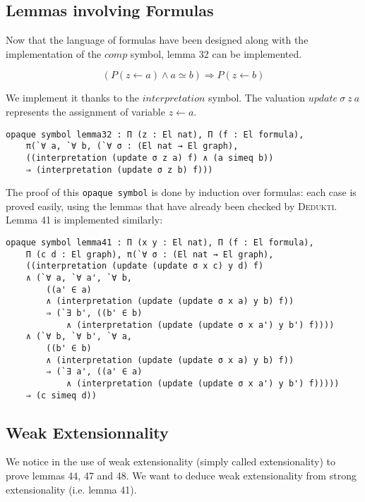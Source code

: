 \documentclass[submission,copyright,creativecommons]{eptcs}
\def\imp{\mathbin{\Rightarrow}}
\def\conj{\mathbin{\wedge}}
\newcommand{\dedukti}{\textsc{Dedukti}}
\begin{document}
\subsection{Lemmas involving Formulas}

Now that the language of formulas have been designed along with the implementation of the $comp$ symbol, lemma 32 can be implemented.

$$(P(z \leftarrow a) \conj a \simeq b) \imp P(z \leftarrow b)$$

We implement it thanks to the $interpretation$ symbol. The valuation $update~\sigma~z~a$ represents the assignment of variable $z \leftarrow a$.

\begin{lstlisting}
opaque symbol lemma32 : Π (z : El nat), Π (f : El formula), 
	π(`∀ a, `∀ b, (`∀ σ : (El nat → El graph),
	((interpretation (update σ z a) f) ∧ (a simeq b)) 
	⇒ (interpretation (update σ z b) f)))
\end{lstlisting}

The proof of this \texttt{opaque symbol} is done by induction over formulas: each case is proved easily, using the lemmas that have already been checked by \dedukti. \\

Lemma 41 is implemented similarly:

\begin{lstlisting}
opaque symbol lemma41 : Π (x y : El nat), Π (f : El formula), 
	Π (c d : El graph), π(`∀ σ : (El nat → El graph), 
	((interpretation (update (update σ x c) y d) f)
	∧ (`∀ a, `∀ a', `∀ b, 
		((a' ∈ a) 
		∧ (interpretation (update (update σ x a) y b) f)) 
		⇒ (`∃ b', ((b' ∈ b) 
			∧ (interpretation (update (update σ x a') y b') f))))
	∧ (`∀ b, `∀ b', `∀ a, 
		((b' ∈ b) 
		∧ (interpretation (update (update σ x a) y b) f)) 
		⇒ (`∃ a', ((a' ∈ a) 
			∧ (interpretation (update (update σ x a') y b') f))))) 
	⇒ (c simeq d))
\end{lstlisting}

\subsection{Weak Extensionnality}

\label{extensionality}

We notice in \cite{zermodulo53} the use of weak extensionality (simply called extensionality) to prove lemmas 44, 47 and 48. We want to deduce weak extensionality from strong extensionality (i.e. lemma 41). \\
\end{document}

